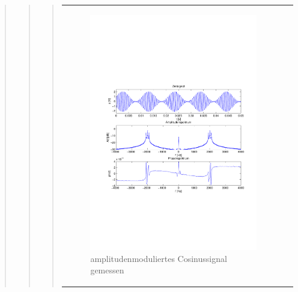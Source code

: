 \begin{quote}
\begin{quote}
\begin{quote}
\begin{center}
\begin{tabular}{ll}
\begin{minipage}{0.6\textwidth}
                         \begin{figure}[H]
                            \label{fig:}
                            \includegraphics[scale=0.4, trim = 2cm 6.5cm 1.5cm
                            8.5cm, clip]{./Bilder/Cosinusmodgemessen} %
                            \caption{amplitudenmoduliertes Cosinussignal gemessen}
                        \end{figure}
                   \vspace{-1.5em}
    
                    \end{minipage}
    
                \end{tabular}
                \end{center}
                

\end{quote}
\end{quote}
\end{quote}
